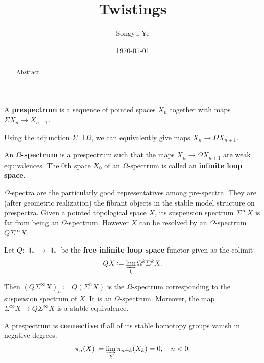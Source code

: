 \documentclass[12pt]{article}
\begin{document}
\rhead{\today}
\cfoot{\thepage}

\title{Twistings}

\author{Songyu Ye}
\date{\today}
\maketitle


\begin{abstract}
    Abstract
\end{abstract}

\tableofcontents

\begin{definition}
    A \textbf{prespectrum} is a sequence of pointed spaces $X_n$ together with maps $\Sigma X_n \to X_{n+1}$.
\end{definition}
Using the adjunction $\Sigma \dashv \Omega$, we can equivalently give maps $X_n \to \Omega X_{n+1}$.

\begin{definition}
    An \textbf{$\Omega$-spectrum} is a prespectrum such that the maps $X_n \to \Omega X_{n+1}$ are weak equivalences. The 0th space $X_0$ of an $\Omega$-spectrum is called an \textbf{infinite loop space}.
\end{definition}
$\Omega$-spectra are the particularly good representatives among pre-spectra. They are (after geometric realization) the fibrant objects in the stable model structure on prespectra. Given a pointed topological space $X$, its suspension spectrum $\Sigma^\infty X$ is far from being an $\Omega$-spectrum. However $X$ can be resolved by an $\Omega$-spectrum $Q\Sigma^\infty X$.

\begin{definition}
    Let $Q: \Top_* \to \Top_*$ be the \textbf{free infinite loop space} functor given as the colimit
    \[
        QX \coloneqq \varinjlim_k \Omega^k \Sigma^k X.
    \]
\end{definition}

Then $(Q\Sigma^\infty X)_n \coloneqq Q(\Sigma^n X)$ is the $\Omega$-spectrum corresponding to the suspension spectrum of $X$. It is an $\Omega$-spectrum. Moreover, the map $\Sigma^\infty X \to Q\Sigma^\infty X$ is a stable equivalence.

\begin{definition}
    A prespectrum is \textbf{connective} if all of its stable homotopy groups vanish in negative degrees. \begin{align*}
        \pi_n(X) \coloneqq \varinjlim_k \pi_{n+k}(X_k) = 0, \quad n < 0.
    \end{align*}
\end{definition}
\end{document}
